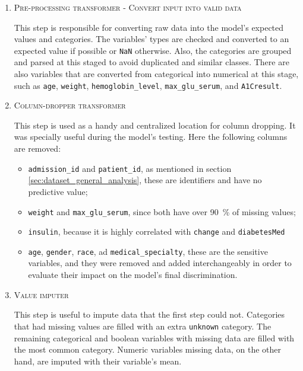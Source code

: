 \documentclass[a4paper,11pt]{article}
\newcommand{\admissionId}{\texttt{admission\_id}\xspace}
\newcommand{\patientId}{\texttt{patient\_id}\xspace}
\newcommand{\race}{\texttt{race}\xspace}
\newcommand{\gender}{\texttt{gender}\xspace}
\newcommand{\age}{\texttt{age}\xspace}
\newcommand{\weight}{\texttt{weight}\xspace}
\newcommand{\medicalSpecialty}{\texttt{medical\_specialty}\xspace}
\newcommand{\hemoglobinLevel}{\texttt{hemoglobin\_level}\xspace}
\newcommand{\maxGluSerum}{\texttt{max\_glu\_serum}\xspace}
\newcommand{\AOneCresult}{\texttt{A1Cresult}\xspace}
\newcommand{\insulin}{\texttt{insulin}\xspace}
\newcommand{\change}{\texttt{change}\xspace}
\newcommand{\diabetesMed}{\texttt{diabetesMed}\xspace}
\begin{document}
\begin{enumerate}
    \item \textsc{Pre-processing transformer - Convert input into valid data}
    
    This step is responsible for converting raw data into the model's expected values and categories. The variables' types are checked and converted to an expected value if possible or \texttt{NaN} otherwise. Also, the categories are grouped and parsed at this staged to avoid duplicated and similar classes.
    There are also variables that are converted from categorical into numerical at this stage, such as \age, \weight, \hemoglobinLevel, \maxGluSerum, and \AOneCresult.
    
    \item \textsc{Column-dropper transformer}
    
    This step is used as a handy and centralized location for column dropping. It was specially useful during the model's testing. Here the following columns are removed: 
    
    \begin{itemize}
        \item \admissionId and \patientId, as mentioned in section \ref{sec:dataset_general_analysis}, these are identifiers and have no predictive value;
        
        \item \weight and \maxGluSerum, since both have over \SI{90}{\percent} of missing values;
        
        \item \insulin, because it is highly correlated with \change and \diabetesMed
        
        \item \age, \gender, \race, ad \medicalSpecialty, these are the sensitive variables, and they were removed and added interchangeably in order to evaluate their impact on the model's final discrimination.
    \end{itemize}
     
    \item \textsc{Value imputer}
    
    This step is useful to impute data that the first step could not. 
    Categories that had missing values are filled with an extra \texttt{unknown} category. The remaining categorical and boolean variables with missing data are filled with the most common category. Numeric variables missing data, on the other hand, are imputed with their variable's mean.
    

\end{enumerate}
\end{document}

